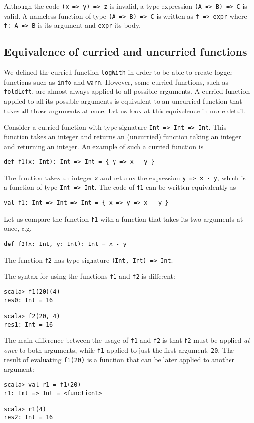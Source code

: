 Although the code \lstinline!(x => y) => z! is invalid, a type expression
\lstinline!(A => B) => C! is valid. A nameless function of type \lstinline!(A => B) => C!
is written as \lstinline!f => expr! where \lstinline!f: A => B!
is its argument and \lstinline!expr! its body. 

\subsection{Equivalence of curried and uncurried functions}

We defined the curried function \lstinline!logWith! in order to be
able to create logger functions such as \lstinline!info! and \lstinline!warn!.
However, some curried functions, such as \lstinline!foldLeft!, are
almost always applied to all possible arguments. A curried function
applied to all its possible arguments is equivalent to an uncurried
function that takes all those arguments at once. Let us look at this
equivalence in more detail.

Consider a curried function with type signature \lstinline!Int => Int => Int!.
This function takes an integer and returns an (uncurried) function
taking an integer and returning an integer. An example of such a curried
function is
\begin{lstlisting}
def f1(x: Int): Int => Int = { y => x - y }
\end{lstlisting}

The function takes an integer \lstinline!x! and returns the expression
\lstinline!y => x - y!, which is a function of type \lstinline!Int => Int!.
The code of \lstinline!f1! can be written equivalently as
\begin{lstlisting}
val f1: Int => Int => Int = { x => y => x - y }
\end{lstlisting}

Let us compare the function \lstinline!f1! with a function that takes
its two arguments at once, e.g.
\begin{lstlisting}
def f2(x: Int, y: Int): Int = x - y
\end{lstlisting}
The function \lstinline!f2! has type signature \lstinline!(Int, Int) => Int!.

The syntax for using the functions \lstinline!f1! and \lstinline!f2!
is different:
\begin{lstlisting}
scala> f1(20)(4)
res0: Int = 16

scala> f2(20, 4)
res1: Int = 16
\end{lstlisting}
The main difference between the usage of \lstinline!f1! and \lstinline!f2!
is that \lstinline!f2! must be applied \emph{at once} to both arguments,
while \lstinline!f1! applied to just the first argument, \lstinline!20!.
The result of evaluating \lstinline!f1(20)! is a function that can
be later applied to another argument:
\begin{lstlisting}
scala> val r1 = f1(20)
r1: Int => Int = <function1> 

scala> r1(4)
res2: Int = 16
\end{lstlisting}

